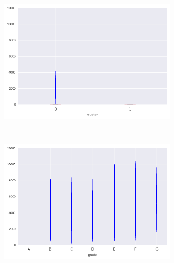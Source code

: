 \begin{anexosenv}
\begin{figure}[t!]
\begin{subfigure}[t]{0.5\textwidth}
            \centerline{\includegraphics[width=1.05\textwidth]{img/out_prncp_inv_by_cluster}}
        \end{subfigure}%
        ~ 
        \begin{subfigure}[t]{0.5\textwidth}
            \centering
   
            \centerline{\includegraphics[width=1.05\textwidth]{img/out_prncp_inv_by_grade}}

        \end{subfigure}
\\
                \caption{total\textunderscore rec\textunderscore int }
        \begin{subfigure}[t]{0.5\textwidth}
            \centering


\end{subfigure}
\end{figure}
\end{anexosenv}
